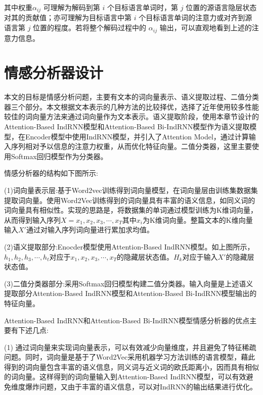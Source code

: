 \documentclass[a4paper,AutoFakeBold,oneside,12pt]{book}
\begin{document}
其中权重$\alpha_{ij}$ 可理解为解码到第 $i$ 个目标语言单词时，第 $j$ 位置的源语言隐层状态对其的贡献值；亦可理解为目标语言中第 $i$ 个目标语言单词的注意力或对齐到源语言第 $j$ 位置的程度。若将整个解码过程中的 $α_{ij}$ 输出，可以直观地看到上述的注意力信息。



\section{情感分析器设计}
本文的目标是情感分析问题，主要有文本的词向量表示、语义提取过程、二值分类器三个部分。本文根据文本表示的几种方法的比较择优，选择了近年使用较多性能较佳的词向量方法来通过词向量作为文本表示。语义提取阶段，使用本章节设计的Attention-Based IndRNN模型和Attention-Based Bi-IndRNN模型作为语义提取模型，在Encoder模型中使用IndRNN模型，并引入了Attention Model，通过计算输入序列相对予以信息的注意力权重，从而优化特征向量。二值分类器，这里主要使用Softmax回归模型作为分类器\cite{zhangchongJiYuAttentionBasedLSTMMoXingDeWenBenFenLeiJiZhuDeYanJiu2016}。

情感分析器的结构如下图所示:


(1)词向量表示层:基于Word2vec训练得到词向量模型，在词向量层由训练集数据集提取词向量。使用Word2Vec训练得到的词向量具有丰富的语义信息，如同义词的词向量具有相似性。实现的思路是，将数据集的单词通过模型训练为K维词向量，从而得到输入序列$X={x_1, x_2, x_3, \cdots, x_T}$其中$x_i$为K维词向量。整篇文本的K维向量输入$X'$通过对输入序列词向量进行累加求均值。

(2)语义提取部分:Enocder模型使用Attention-Based IndRNN模型。如上图所示，$h_1,h_2,h_3, \cdots, h_t$对应于$x_1, x_2, x_3, \cdots, x_T$的隐藏层状态值。$H_k$对应于输入$X'$的隐藏层状态值。

(3)二值分类器部分:采用Softmax回归模型构建二值分类器。输入向量是上述语义提取部分Attention-Based IndRNN模型和Attention-Based Bi-IndRNN模型输出的特征向量。

Attention-Based IndRNN和Attention-Based Bi-IndRNN模型情感分析器的优点主要有下述几点:

(1) 通过词向量来实现词向量表示，可以有效减少向量维度，并且避免了特征稀疏问题。同时，词向量是基于了Word2Vec采用机器学习方法训练的语言模型，藉此得到的词向量包含丰富的语义信息，同义词与近义词的欧氏距离小，因而具有相似的词向量。这样得到的词向量输入到Attention-Based IndRNN模型，可以有效避免维度爆炸问题，又由于丰富的语义信息，可以对IndRNN的输出结果进行优化。
\end{document}
